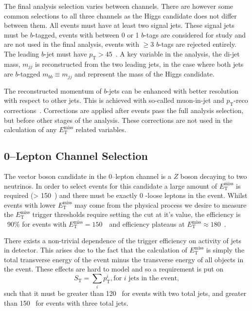 The final analysis selection varies between channels. There are however some
common selections to all three channels as the Higgs candidate does not differ
between them. All events must have at least two signal jets. These signal jets
must be $b$-tagged, events with between 0 or 1 $b$-tags are considered for study
and are not used in the final analysis, events with $\ge3$ $b$-tags are rejected
entirely. The leading $b$-jet must have $p_{\mathrm{T}} > 45$~\GeV. A key variable in the
analysis, the di-jet mass, $m_{jj}$ is reconstructed from the two leading jets,
in the case where both jets are $b$-tagged $m_{bb} \equiv m_{jj}$ and represent
the mass of the Higgs candidate.

The reconstructed momentum of $b$-jets can be enhanced with better resolution
with respect to other jets. This is achieved with so-called muon-in-jet and
$p_{\mathrm{T}}$-reco corrections~\cite{VHObjectNote2019}. Corrections are applied after
events pass the full analysis selection, but before other stages of the
analysis. These corrections are not used in the calculation of any
$E_{\mathrm{T}}^{\text{miss}}$ related variables.

\subsection{0--Lepton Channel Selection}
\label{sec:0lep-selection}

The vector boson candidate in the 0--lepton channel is a $Z$ boson decaying to
two neutrinos. In order to select events for this candidate a large amount of
$E_{\mathrm{T}}^{\text{miss}}$ is required (> 150~\GeV) and there must be exactly 0
\VH-loose leptons in the event. Whilst events with lower $E_{\mathrm{T}}^{\text{miss}}$
may come from the physical process we desire to measure the $E_{\mathrm{T}}^{\text{miss}}$
trigger thresholds require setting the cut at it's value, the efficiency is
~90\% for events with $E_{\mathrm{T}}^{\text{miss}} = 150$~\GeV\ and efficiency plateaus at
$E_{\mathrm{T}}^{\text{miss}} \approx 180$~\GeV.

There exists a non-trivial dependence of the trigger efficiency on activity of
jets in detector. This arises due to the fact that the calculation of
$E_{\mathrm{T}}^{\text{miss}}$ is simply the total transverse energy of the event minus the
transverse energy of all objects in the event. These effects are hard to model
and so a requirement is put on
\begin{equation}
  S_{\mathrm{T}} = \sum_i p_{\mathrm{T}}^i, \text{for } i \text{ jets in the event,}
\end{equation}
such that it must be greater than 120 \GeV\ for events with two total jets, and
greater than 150 \GeV\ for events with three total jets.

